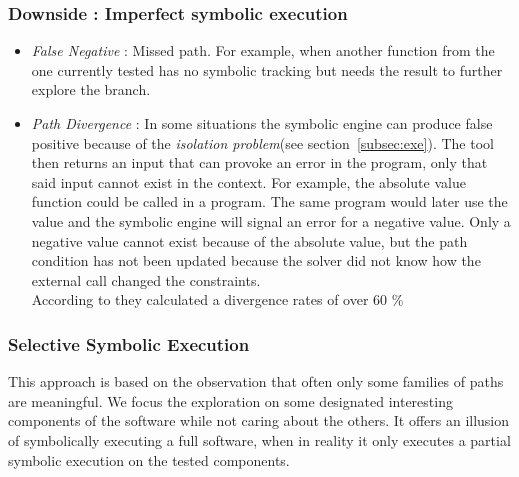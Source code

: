\documentclass[11pt]{IEEEtran}
\begin{document}
  		\subsubsection*{Downside : Imperfect symbolic execution}
  			\begin{itemize} %
  				\item \emph{False Negative} : Missed path. For example, when another function from the one currently tested has no symbolic tracking but needs the result to further explore the branch.
  				\item \emph{Path Divergence} : In some situations the symbolic engine can produce false positive because of the \emph{isolation problem}(see section~\ref{subsec:exe}). The tool then returns an input that can provoke an error in the program, only that said input cannot exist in the context. For example, the absolute value function could be called in a program. The same program would later use the value and the symbolic engine will signal an error for a negative value. Only a negative value cannot exist because of the absolute value, but the path condition has not been updated because the solver did not know how the external call changed the constraints. \\ %
  				According to \cite{Godefroid2008AutomatedWF} they calculated a divergence rates of over 60 \%
  			\end{itemize}

    	\subsubsection{Selective Symbolic Execution}
    	\label{subsec:selectiveSymbolicExec}
    		This approach is based on the observation that often only some families of paths are meaningful\cite{chipounov2012s2e}. We focus the exploration on some designated interesting components of the software while not caring about the others. It offers an illusion of symbolically executing a full software, when in reality it only executes a partial symbolic execution on the tested components.\\
\end{document}
